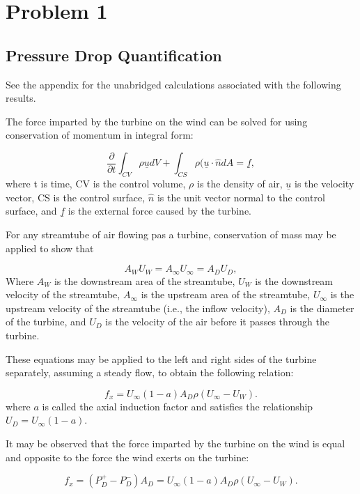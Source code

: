 \documentclass{article}
\begin{document}
\section{Problem 1}
\subsection{Pressure Drop Quantification}
See the appendix for the unabridged calculations associated with the following results.

The force imparted by the turbine on the wind can be solved for using conservation of momentum in integral form:

\begin{equation}
\frac{\partial}{\partial t} \int_{CV} \rho \underline{u} dV + \int_{CS} \rho (\underline{u} \cdot \hat{n} dA = \underline{f},
\end{equation}
where t is time, CV is the control volume, $\rho$ is the density of air, $\underline{u}$ is the velocity vector, CS is the control surface, $\hat{n}$ is the unit vector normal to the control surface, and $\underline{f}$ is the external force caused by the turbine.

For any streamtube of air flowing pas a turbine, conservation of mass may be applied to show that

\begin{equation}
\label{mass}
A_W U_W = A_\infty U_\infty = A_D U_D,
\end{equation}
Where $A_W$ is the downstream area of the streamtube, $U_W$ is the downstream velocity of the streamtube, $A_\infty$ is the upstream area of the streamtube, $U_\infty$ is the upstream velocity of the streamtube (i.e., the inflow velocity), $A_D$ is the diameter of the turbine, and $U_D$ is the velocity of the air before it passes through the turbine.

These equations may be applied to the left and right sides of the turbine separately, assuming a steady flow, to obtain the following relation:

\begin{equation}
f_x = U_\infty (1-a)A_D\rho (U_\infty - U_W).
\end{equation}
where $a$ is called the axial induction factor and satisfies the relationship $U_D=U_\infty(1-a)$.

It may be observed that the force imparted by the turbine on the wind is equal and opposite to the force the wind exerts on the turbine:

\begin{equation}
f_x = (P_D^+ - P_D^-)A_D = U_\infty (1-a)A_D\rho (U_\infty - U_W).
\label{pressure}
\end{equation}
\end{document}
